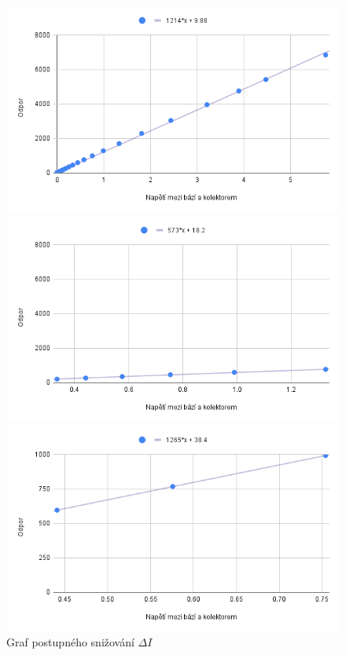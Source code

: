 \documentclass[a4paper]{article}
\begin{document}
\iffalse
\begin{figure}[H]
	\centering
	\begin{minipage}[b]{0.33\textwidth}
		\includegraphics[width=\textwidth]{chart.png}
	\end{minipage}
	\begin{minipage}[b]{0.33\textwidth}
		\includegraphics[width=\textwidth]{chart (1).png}
	\end{minipage}
	\begin{minipage}[b]{0.33\textwidth}
		\includegraphics[width=\textwidth]{chart (2).png}
	\end{minipage}
	\caption{Graf postupného snižování $\Delta I$}
\end{figure}
\end{document}
